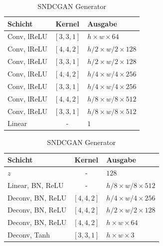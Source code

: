 \begin{table}[]
  \caption{SNDCGAN Architektur}
  \label{tab:sndcgan}
  \begin{center}
    \begin{minipage}{.5\linewidth}
      \caption{SNDCGAN Discriminator}
      \centering
        \begin{tabular}{lcl}
            \toprule
            Schicht & Kernel & Ausgabe\\
            \toprule
            Conv, lReLU & $[3,3,1]$ & $h \times w \times 64$\\
            \midrule
            Conv, lReLU & $[4,4,2]$ & $h/2 \times w/2 \times 128$\\
            \midrule
            Conv, lReLU & $[3,3,1]$ & $h/2 \times w/2 \times 128$\\
            \midrule
            Conv, lReLU & $[4,4,2]$ & $h/4 \times w/4 \times 256$\\
            \midrule
            Conv, lReLU & $[3,3,1]$ & $h/4 \times w/4 \times 256$\\
            \midrule
            Conv, lReLU & $[4,4,2]$ & $h/8 \times w/8 \times 512$\\
            \midrule
            Conv, lReLU & $[3,3,1]$ & $h/8 \times w/8 \times 512$\\
            \midrule
            Linear & - & $1$\\
            \bottomrule
        \end{tabular}
    \end{minipage}%
    \begin{minipage}{.5\linewidth}
      \centering
        \caption{SNDCGAN Generator}
        \begin{tabular}{lcl}
            \toprule
            Schicht & Kernel & Ausgabe\\
            \toprule
            $z$ & - & $128$\\
            \midrule
            Linear, BN, ReLU & - & $h/8 \times w/8 \times 512$\\
            \midrule
            Deconv, BN, ReLU & $[4,4,2]$ & $h/4 \times w/4 \times 256$\\
            \midrule
            Deconv, BN, ReLU & $[4,4,2]$ & $h/2 \times w/2 \times 128$\\
            \midrule
            Deconv, BN, ReLU & $[4,4,2]$ & $h \times w \times 64$\\
            \midrule
            Deconv, Tanh & $[3,3,1]$ & $h \times w \times 3$\\

\end{tabular}
\end{minipage}
\end{center}
\end{table}
